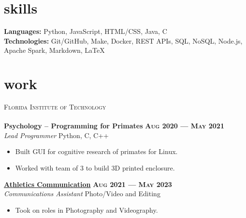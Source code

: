 \documentclass[margin,10pt]{res}
\begin{document}
\begin{resume}
\begin{itemize}
        \end{itemize}

    \section{\sc skills}
        \textbf{Languages:} Python, JavaScript, \textsc{HTML/CSS}, Java, C           \\
        \textbf{Technologies:} Git/GitHub, Make, Docker, REST APIs, SQL, NoSQL, Node.js, Apache Spark, Markdown, LaTeX

    \section{\sc work}
        \textsc{Florida Institute of Technology}
        \\\\
        \textbf{Psychology -- Programming for Primates}
        \hfill
        \textsc{\bfseries Aug 2020 --- May 2021}
        \\
        \textit{Lead Programmer}
        \hfill
        Python, C, C++
        \vspace{0.5em}
        \begin{itemize}
            \item Built GUI for cognitive research of primates for Linux.
            \item Worked with team of 3 to build 3D printed enclosure.
        \end{itemize}

        \href{https://floridatechsports.com/}{\textbf{Athletics Communication}}
        \hfill
        \textsc{\bfseries Aug 2021 --- May 2023}
        \\
        \textit{Communications Assistant}
        \hfill
        Photo/Video and Editing
        \vspace{0.5em}
        \begin{itemize}
            \item Took on roles in Photography and Videography.
        \end{itemize}


\end{resume}
\end{document}

